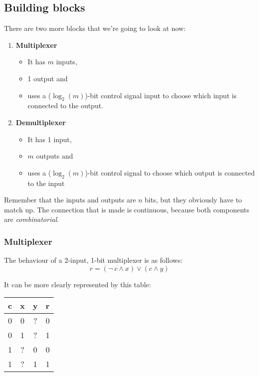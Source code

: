 \documentclass[11pt,a4paper,titlepage,dvipsnames,cmyk]{scrartcl}
\begin{document}
\subsection{Building blocks}%
\label{sub:blocks}

There are two more blocks that we're going to look at now:
\begin{enumerate}
    \item \textbf{Multiplexer}
        \begin{itemize}
            \item It has $m$ inputs,
            \item 1 output and
            \item uses a ($\log_2(m)$)-bit control signal input to choose
                which input is connected to the output.
        \end{itemize}
    \item \textbf{Demultiplexer}
        \begin{itemize}
            \item It has 1 input,
            \item $m$ outputs and
            \item uses a ($\log_2(m)$)-bit control signal to choose which
                output is connected to the input
        \end{itemize}
\end{enumerate}

Remember that the inputs and outputs are $n$ bits, but they obviously have
to match up. The connection that is made is continuous, because both
components are \textit{combinatorial}.

\subsubsection{Multiplexer}%
\label{ssub:Multiplexer}
The behaviour of a 2-input, 1-bit multiplexer is as follows:
\begin{equation*}
    r = (\neg \ c \wedge x) \vee (c \wedge y)
\end{equation*}

It can be more clearly represented by this table:
\begin{center}
    \begin{tabular}{|c c c|c|}
        \hline
        c & x & y & r \\
        \hline
        0 & 0 & ? & 0 \\ \hline
        0 & 1 & ? & 1 \\ \hline
        1 & ? & 0 & 0 \\ \hline
        1 & ? & 1 & 1 \\ \hline
    \end{tabular}
\end{center}
\end{document}
